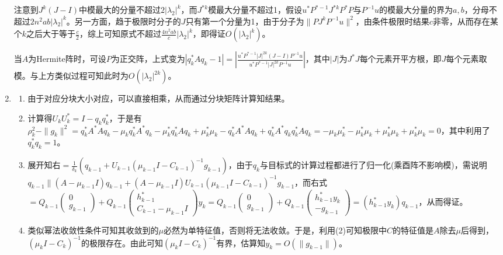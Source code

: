 \documentclass[a4paper,UTF8,fontset=windows]{ctexart}
\begin{document}
\begin{enumerate}
注意到$J^k(J-I)$中模最大的分量不超过$2|\lambda_2|^k$，而$J^{*k}$模最大分量不超过1，假设$u^*P^{*-1}J^{*k}P^*P$与$P^{-1}u$的模最大分量的界为$a,b$，分母不超过$2n^2ab|\lambda_2|^k$。另一方面，趋于极限时分子的$J$只有第一个分量为1，由于分子为$\|PJ^kP^{-1}u\|^2$，由条件极限时结果$c$非零，从而存在某个$k$之后大于等于$\frac{c}{2}$，综上可知原式不超过$\frac{4n^2ab}{c}|\lambda_2|^k$，即得证$O(|\lambda_2|^k)$。

当$A$为Hermite阵时，可设$P$为正交阵，上式变为$|q_k^*Aq_k-1|=\left|\frac{u^*P^{*-1}|J|^{2k}(J-I)P^{-1}u}{u^*P^{*-1}|J|^{2k}P^{-1}u}\right|$，其中$|J|$为$J^*J$每个元素开平方根，即$J$每个元素取模。与上方类似过程可知此时为$O(|\lambda_2|^{2k})$。

\item
\begin{enumerate}[(1)]
\item
由于对应分块大小对应，可以直接相乘，从而通过分块矩阵计算知结果。

\item
计算得$U_kU_k^*=I-q_kq_k^*$，于是有$\rho_k^2-\|g_k\|^2=q_k^*A^*Aq_k-\mu_kq_k^*A^*q_k-\mu_k^*q_k^*Aq_k+\mu_k^*\mu_k-q_k^*A^*Aq_k+q_k^*A^*q_kq_k^*Aq_k=-\mu_k\mu_k^*-\mu_k^*\mu_k+\mu_k^*\mu_k+\mu_k^*\mu_k=0$，其中利用了$q_k^*q_k=1$。

\item
展开知右$=\frac{1}{\delta_k}(q_{k-1}+U_{k-1}(\mu_{k-1}I-C_{k-1})^{-1}g_{k-1})$，由于$q_k$与目标式的计算过程都进行了归一化(乘酉阵不影响模)，需说明$q_{k-1}\parallel(A-\mu_{k-1}I)q_{k-1}+(A-\mu_{k-1}I)U_{k-1}(\mu_{k-1}I-C_{k-1})^{-1}g_{k-1}$，而右式$=Q_{k-1}\begin{pmatrix}0\\g_{k-1}\end{pmatrix}+Q_{k-1}\begin{pmatrix}h_{k-1}^*\\C_{k-1}-\mu_{k-1}I\end{pmatrix}y_k=Q_{k-1}\begin{pmatrix}0\\g_{k-1}\end{pmatrix}+Q_{k-1}\begin{pmatrix}h_{k-1}^*y_k\\-g_{k-1}\end{pmatrix}=(h_{k-1}^*y_k)q_{k-1}$，从而得证。

\item
类似幂法收敛性条件可知其收敛到的$\mu$必然为单特征值，否则将无法收敛。于是，利用(2)可知极限中$C$的特征值是$A$除去$\mu$后得到，$(\mu_kI-C_k)^{-1}$的极限存在。由此可知$(\mu_kI-C_k)^{-1}$有界，估算知$y_k=O(\|g_{k-1}\|)$。


\end{enumerate}
\end{enumerate}
\end{document}
